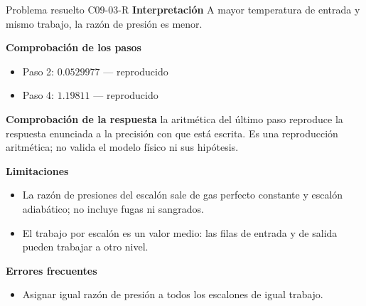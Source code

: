 \documentclass[10pt,openany]{book}
\begin{document}
\begin{studiumworked}{Problema resuelto C09-03-R}
\noindent\textbf{Interpretación}
A mayor temperatura de entrada y mismo trabajo, la razón de presión es menor.

\noindent\textbf{Comprobación de los pasos}
\begin{itemize}
\item Paso 2: $0.0529977$ — reproducido
\item Paso 4: $1.19811$ — reproducido
\end{itemize}

\noindent\textbf{Comprobación de la respuesta} la aritmética del último paso reproduce la respuesta enunciada a la precisión con que está escrita. Es una reproducción aritmética; no valida el modelo físico ni sus hipótesis.

\noindent\textbf{Limitaciones}
\begin{itemize}
\item La razón de presiones del escalón sale de gas perfecto constante y escalón adiabático; no incluye fugas ni sangrados.
\item El trabajo por escalón es un valor medio: las filas de entrada y de salida pueden trabajar a otro nivel.
\end{itemize}

\noindent\textbf{Errores frecuentes}
\begin{itemize}
\item Asignar igual razón de presión a todos los escalones de igual trabajo.
\end{itemize}
\end{studiumworked}
\end{document}
